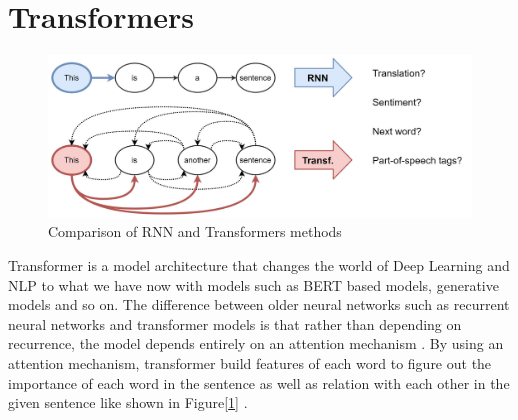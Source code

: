 \section{Transformers}

\begin{figure}[ht]
    \centerline{\includegraphics[scale=0.17]{Figures/rnn-transf-nlp.jpg}}
    \caption{Comparison of RNN and Transformers methods}
    \label{fig:rnn-transf}
 \end{figure}

Transformer is a model architecture that changes the world of Deep Learning and NLP to what we have now with models such as BERT based models, generative models and so on. The difference between older neural networks such as recurrent neural networks and transformer models is that rather than depending on recurrence, the model depends entirely on an attention mechanism \cite{Vaswani_Shazeer_Parmar_Uszkoreit_Jones_Gomez_Kaiser_Polosukhin_2023}. By using an attention mechanism, transformer build features of each word to figure out the importance of each word in the sentence as well as relation with each other in the given sentence like shown in Figure[\ref{fig:rnn-transf}] \cite{Vaswani_Shazeer_Parmar_Uszkoreit_Jones_Gomez_Kaiser_Polosukhin_2023}.

